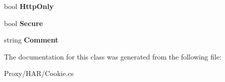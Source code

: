 \begin{DoxyCompactItemize}
\item 
\hypertarget{class_proto_test_1_1_golem_1_1_proxy_1_1_h_a_r_1_1_cookie_a94c5a09381dc120f6af32603c3bf1e6b}{bool {\bfseries Http\-Only}}\label{class_proto_test_1_1_golem_1_1_proxy_1_1_h_a_r_1_1_cookie_a94c5a09381dc120f6af32603c3bf1e6b}

\item 
\hypertarget{class_proto_test_1_1_golem_1_1_proxy_1_1_h_a_r_1_1_cookie_af7ae32dd242c615f07811ff16838e4c1}{bool {\bfseries Secure}}\label{class_proto_test_1_1_golem_1_1_proxy_1_1_h_a_r_1_1_cookie_af7ae32dd242c615f07811ff16838e4c1}

\item 
\hypertarget{class_proto_test_1_1_golem_1_1_proxy_1_1_h_a_r_1_1_cookie_aa72739a7982ef7731ceb1025d4981cce}{string {\bfseries Comment}}\label{class_proto_test_1_1_golem_1_1_proxy_1_1_h_a_r_1_1_cookie_aa72739a7982ef7731ceb1025d4981cce}

\end{DoxyCompactItemize}


The documentation for this class was generated from the following file\-:\begin{DoxyCompactItemize}
\item 
Proxy/\-H\-A\-R/Cookie.\-cs\end{DoxyCompactItemize}
